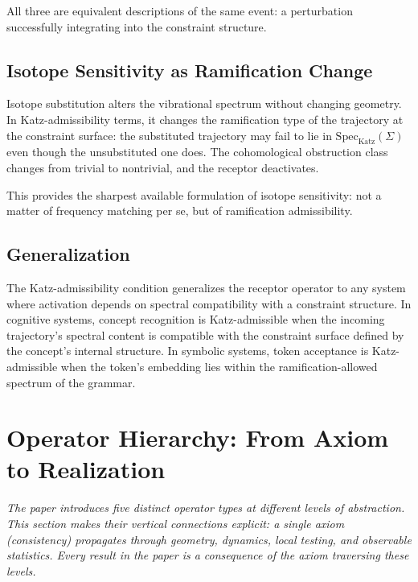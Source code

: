 \documentclass[12pt,a4paper]{article}
\begin{document}
All three are equivalent descriptions of the same event: a perturbation successfully integrating into the constraint structure.

\subsection{Isotope Sensitivity as Ramification Change}

Isotope substitution alters the vibrational spectrum without changing geometry. In Katz-admissibility terms, it changes the ramification type of the trajectory at the constraint surface: the substituted trajectory may fail to lie in $\mathrm{Spec}_{\mathrm{Katz}}(\Sigma)$ even though the unsubstituted one does. The cohomological obstruction class changes from trivial to nontrivial, and the receptor deactivates.

This provides the sharpest available formulation of isotope sensitivity: not a matter of frequency matching per se, but of ramification admissibility.

\subsection{Generalization}

The Katz-admissibility condition generalizes the receptor operator to any system where activation depends on spectral compatibility with a constraint structure. In cognitive systems, concept recognition is Katz-admissible when the incoming trajectory's spectral content is compatible with the constraint surface defined by the concept's internal structure. In symbolic systems, token acceptance is Katz-admissible when the token's embedding lies within the ramification-allowed spectrum of the grammar.

\section{Operator Hierarchy: From Axiom to Realization}
\label{sec:hierarchy}

\textit{The paper introduces five distinct operator types at different levels of abstraction. This section makes their vertical connections explicit: a single axiom (consistency) propagates through geometry, dynamics, local testing, and observable statistics. Every result in the paper is a consequence of the axiom traversing these levels.}
\end{document}
